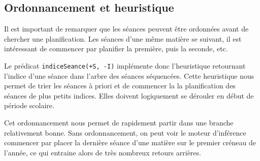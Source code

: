 
\subsection{Ordonnancement et heuristique}

Il est important de remarquer que les séances peuvent être ordonnées avant de
chercher une planification. Les séances d'une même matière se suivant, il est
intéressant de commencer par planifier la première, puis la seconde, etc.

Le prédicat \texttt{indiceSeance(+S, -I)} implémente donc l'heuristique
retournant l'indice d'une séance dans l'arbre des séances séquencées. Cette
heuristique nous permet de trier les séances à priori et de commencer la
la planification des séances de plus petits indices. Elles doivent logiquement
se dérouler en début de période scolaire.

Cet ordonnancement nous permet de rapidement partir dans une branche
relativement bonne. Sans ordonnancement, on peut voir le moteur d'inférence
commencer par placer la dernière séance d'une matière sur le premier
créneau de l'année, ce qui entraine alors de très nombreux retours arrières.

